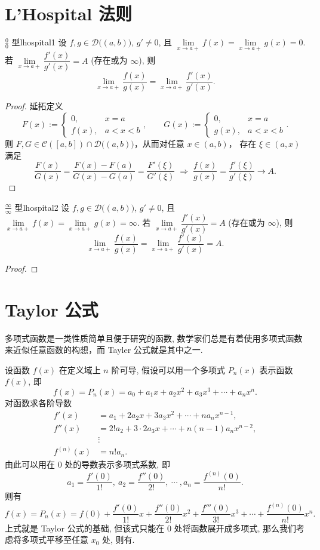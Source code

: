 \documentclass[cn,toc=twocol]{elegantbook}
\newcommand{\D}{\mathscr{D}}
\begin{document}
\section{L'Hospital 法则}

\begin{theorem}{$\frac{0}{0}$ 型}{lhospital1}
	设 $f,g\in \D\bigl((a,b)\bigr)$, $g'\neq 0$, 且
$\lim\limits_{x\to a+}f(x)=\lim\limits_{x\to a+}g(x)=0$. 若
$\lim\limits_{x\to a+}\dfrac{f'(x)}{g'(x)}=A$ (存在或为 $\infty$), 则
\[
\lim_{x\to a+}\frac{f(x)}{g(x)}=\lim_{x\to a+}\frac{f'(x)}{g'(x)}.
\]
\end{theorem}
\begin{proof}
	延拓定义
\[
F(x):=\begin{cases}0,&x=a\\ f(x),&a<x<b\end{cases},
\qquad
G(x):=\begin{cases}0,&x=a\\ g(x),&a<x<b\end{cases}.
\]
则 $F,G\in \mathscr{C}([a,b])\cap \D\bigl((a,b)\bigr)$，从而对任意 $x\in(a,b)$，
存在 $\xi\in(a,x)$ 满足
\[
\frac{F(x)}{G(x)}=\frac{F(x)-F(a)}{G(x)-G(a)}=\frac{F'(\xi)}{G'(\xi)}
\;\Longrightarrow\;
\frac{f(x)}{g(x)}=\frac{f'(\xi)}{g'(\xi)}\to A.
\]
\end{proof}

\begin{theorem}{$\frac{\infty}{\infty}$ 型}{lhospital2}
	设 $f,g\in \D\bigl((a,b)\bigr)$, $g'\neq 0$, 且 $\lim\limits_{x\to a+}f(x)=\lim\limits_{x\to a+}g(x)=\infty$. 若 $\lim\limits_{x\to a+}\dfrac{f'(x)}{g'(x)}=A$ (存在或为 $\infty$), 则
\[
\lim_{x\to a+}\frac{f(x)}{g(x)} = \lim_{x\to a+}\frac{f'(x)}{g'(x)} = A.
\]
\end{theorem}
\begin{proof}
\end{proof}

\section{Taylor 公式}

多项式函数是一类性质简单且便于研究的函数, 数学家们总是有着使用多项式函数来近似任意函数的构想，而 Tayler 公式就是其中之一.

设函数 $f(x)$ 在定义域上 $n$ 阶可导, 假设可以用一个多项式 $P_n(x)$ 表示函数 $f(x)$, 即
\[
	f(x) = P_n(x) = a_0 + a_1 x + a_2 x^2 + a_3 x^3 + \cdots + a_n x^n.
\]
对函数求各阶导数
\[
\begin{aligned}
	f'(x) &= a_1 + 2 a_2 x + 3 a_3 x^2 + \cdots + n a_n x^{n - 1},\\
	f''(x) &= 2! a_2 + 3 \cdot 2 a_3 x + \cdots + n (n - 1) a_n x^{n - 2},\\
	&\vdots\\
	f^{(n)}(x) &= n! a_n.
\end{aligned}
\]
由此可以用在 $0$ 处的导数表示多项式系数, 即
\[
	a_1 = \frac{f'(0)}{1!},\ a_2 = \frac{f''(0)}{2!},\ \cdots\ , a_n = \frac{f^{(n)}(0)}{n!}. 
\]
则有
\[
	f(x) = P_n(x) = f(0) + \frac{f'(0)}{1!} x + \frac{f''(0)}{2!} x^2 + \frac{f'''(0)}{3!} x^3 + \cdots + \frac{f^{(n)}(0)}{n!} x^n.
\]
上式就是 Taylor 公式的基础, 但该式只能在 $0$ 处将函数展开成多项式, 那么我们考虑将多项式平移至任意 $x_0$ 处, 则有.
\end{document}
